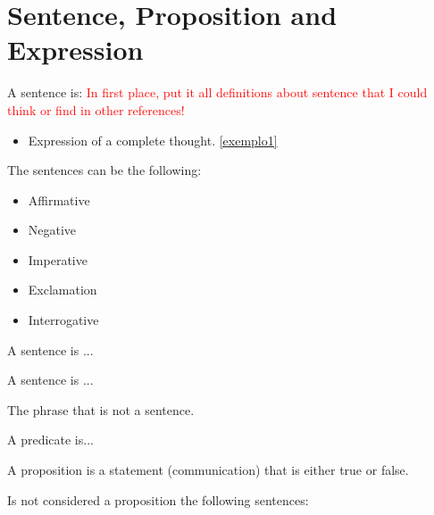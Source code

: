 \section{Sentence, Proposition and Expression}

\begin{definition}[Sentence]
    A sentence is: \textcolor{red}{In first place, put it all definitions about sentence that I could think or find in other references!}

    \begin{itemize}
        \item Expression of a complete thought. \ref{exemplo1}
    \end{itemize}

\end{definition}

The sentences can be the following:

\begin{itemize}
    \item Affirmative
    \item Negative
    \item Imperative
    \item Exclamation
    \item Interrogative
\end{itemize}

\begin{definition}
A sentence is ...


\end{definition}

\begin{definition}
A sentence is ...


\end{definition}

\begin{remark}[Expression]
    The phrase that is not a sentence.
\end{remark}

\begin{definition}[Predicate]
    A predicate is...
\end{definition}

\begin{definition}[Proposition]
A proposition is a statement (communication) that is either true or false. \cite{ericlehman}
\end{definition}

Is not considered a proposition the following sentences:

